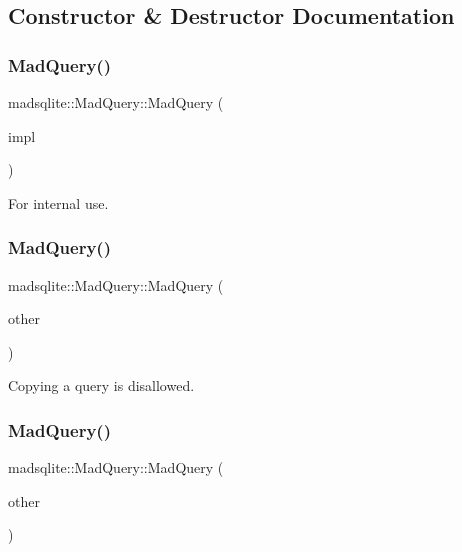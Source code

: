 \subsection{Constructor \& Destructor Documentation}
\hypertarget{classmadsqlite_1_1_mad_query_a4e7a3212c6dd8c86e5579e43627b9013}{}\label{classmadsqlite_1_1_mad_query_a4e7a3212c6dd8c86e5579e43627b9013} 
\subsubsection{\texorpdfstring{Mad\+Query()}{MadQuery()}\hspace{0.1cm}{\footnotesize\ttfamily [1/3]}}
{\footnotesize\ttfamily madsqlite\+::\+Mad\+Query\+::\+Mad\+Query (\begin{DoxyParamCaption}\item[{std\+::unique\+\_\+ptr$<$ Impl $>$}]{impl }\end{DoxyParamCaption})}

For internal use. \hypertarget{classmadsqlite_1_1_mad_query_a52f4a1417de26c9e2edb46bae17892ef}{}\label{classmadsqlite_1_1_mad_query_a52f4a1417de26c9e2edb46bae17892ef} 
\subsubsection{\texorpdfstring{Mad\+Query()}{MadQuery()}\hspace{0.1cm}{\footnotesize\ttfamily [2/3]}}
{\footnotesize\ttfamily madsqlite\+::\+Mad\+Query\+::\+Mad\+Query (\begin{DoxyParamCaption}\item[{\hyperlink{classmadsqlite_1_1_mad_query}{Mad\+Query} \&}]{other }\end{DoxyParamCaption})\hspace{0.3cm}{\ttfamily [delete]}}

Copying a query is disallowed. \hypertarget{classmadsqlite_1_1_mad_query_a0a4ebbd16bfc54d95fc7a87517d4f21e}{}\label{classmadsqlite_1_1_mad_query_a0a4ebbd16bfc54d95fc7a87517d4f21e} 
\subsubsection{\texorpdfstring{Mad\+Query()}{MadQuery()}\hspace{0.1cm}{\footnotesize\ttfamily [3/3]}}
{\footnotesize\ttfamily madsqlite\+::\+Mad\+Query\+::\+Mad\+Query (\begin{DoxyParamCaption}\item[{\hyperlink{classmadsqlite_1_1_mad_query}{Mad\+Query} \&\&}]{other }\end{DoxyParamCaption})}

